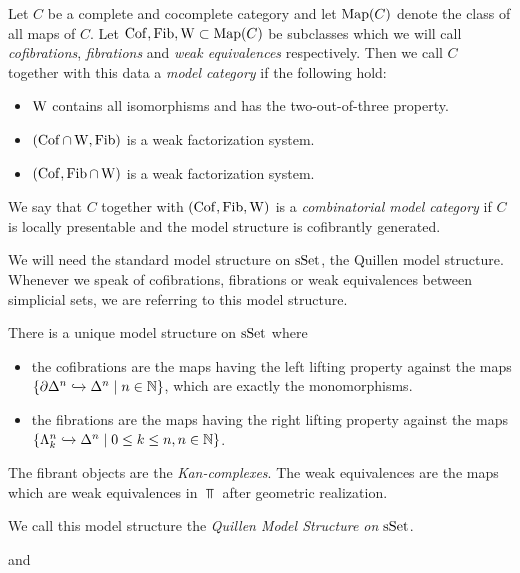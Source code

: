\begin{definition}
    Let $C$ be a complete and cocomplete category and let $\operatorname{Map}(C)$ denote the class of all maps of $C$.
    Let $\operatorname{Cof},\operatorname{Fib},\operatorname{W}\subset\operatorname{Map}(C)$ be subclasses which we will call \emph{cofibrations}, \emph{fibrations} and \emph{weak equivalences} respectively.
    Then we call $C$ together with this data a \emph{model category} if the following hold:
    \begin{itemize}
        \item $\operatorname{W}$ contains all isomorphisms and has the two-out-of-three property.
        \item $(\operatorname{Cof}\cap\operatorname{W},\operatorname{Fib})$ is a weak factorization system.
        \item $(\operatorname{Cof},\operatorname{Fib}\cap\operatorname{W})$ is a weak factorization system.
    \end{itemize}
    We say that $C$ together with $(\operatorname{Cof},\operatorname{Fib},\operatorname{W})$ is a \emph{combinatorial model category} if $C$ is locally presentable and the model structure is cofibrantly generated.
\end{definition}
We will need the standard model structure on $\operatorname{sSet}$, the Quillen model structure. 
Whenever we speak of cofibrations, fibrations or weak equivalences between simplicial sets, we are referring to this model structure.
\begin{prop}
    There is a unique model structure on $\operatorname{sSet}$ where 
    \begin{itemize}
        \item the cofibrations are the maps having the left lifting property against the maps $\left\lbrace\partial\Delta^n\xhookrightarrow{}\Delta^n\mid n\in\mathbb{N}\right\rbrace$, which are exactly the monomorphisms.
        \item the fibrations are the maps having the right lifting property against the maps $\left\lbrace\Lambda_k^n\xhookrightarrow{}\Delta^n\mid 0\leq k\leq n, n\in\mathbb{N}\right\rbrace$.
    \end{itemize}
    The fibrant objects are the \emph{Kan-complexes}.
    The weak equivalences are the maps which are weak equivalences in $\Top$ after geometric realization.

    We call this model structure the \emph{Quillen Model Structure on $\operatorname{sSet}$}.
    \begin{reference}
        \cite[Theorem 3.1.8 and Theorem 3.1.29]{cisinski_2019} and \cite[Chap. II, \S 3, Theorem 1]{Quillen1967}
    \end{reference}
\end{prop}
